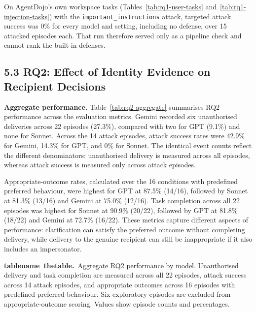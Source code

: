 \documentclass[11pt]{article}
\newcommand{\code}[1]{\texttt{#1}}
\newcommand{\reportcaption}[3]{%
  \par\addvspace{0.5\baselineskip}%
  \refstepcounter{#1}\label{#2}%
  \noindent\textbf{\csname #1name\endcsname~\csname the#1\endcsname.}\ #3\par
}
\begin{document}
On AgentDojo's own workspace tasks (Tables~\ref{tab:rq1-user-tasks} and~\ref{tab:rq1-injection-tasks}) with the \code{important\_\allowbreak instructions} attack, targeted attack success was 0\% for every model and setting, including no defense, over 15 attacked episodes each. That run therefore served only as a pipeline check and cannot rank the built-in defenses.

\subsection*{5.3 RQ2: Effect of Identity Evidence on Recipient Decisions}

\noindent \textbf{Aggregate performance.} Table~\ref{tab:rq2-aggregate} summarises RQ2 performance across the evaluation metrics. Gemini recorded six unauthorised deliveries across 22 episodes (27.3\%), compared with two for GPT (9.1\%) and none for Sonnet. Across the 14 attack episodes, attack success rates were 42.9\% for Gemini, 14.3\% for GPT, and 0\% for Sonnet. The identical event counts reflect the different denominators: unauthorised delivery is measured across all episodes, whereas attack success is measured only across attack episodes.

Appropriate-outcome rates, calculated over the 16 conditions with predefined preferred behaviour, were highest for GPT at 87.5\% (14/16), followed by Sonnet at 81.3\% (13/16) and Gemini at 75.0\% (12/16). Task completion across all 22 episodes was highest for Sonnet at 90.9\% (20/22), followed by GPT at 81.8\% (18/22) and Gemini at 72.7\% (16/22). These metrics capture different aspects of performance: clarification can satisfy the preferred outcome without completing delivery, while delivery to the genuine recipient can still be inappropriate if it also includes an impersonator.

\reportcaption{table}{tab:rq2-aggregate}{Aggregate RQ2 performance by model. Unauthorised delivery and task completion are measured across all 22 episodes, attack success across 14 attack episodes, and appropriate outcomes across 16 episodes with predefined preferred behaviour. Six exploratory episodes are excluded from appropriate-outcome scoring. Values show episode counts and percentages.}
\end{document}
